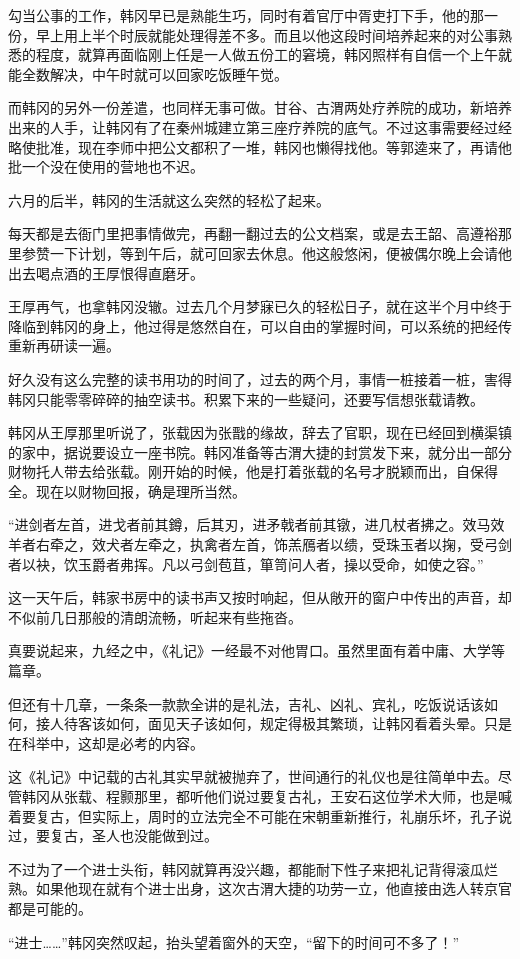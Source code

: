勾当公事的工作，韩冈早已是熟能生巧，同时有着官厅中胥吏打下手，他的那一份，早上用上半个时辰就能处理得差不多。而且以他这段时间培养起来的对公事熟悉的程度，就算再面临刚上任是一人做五份工的窘境，韩冈照样有自信一个上午就能全数解决，中午时就可以回家吃饭睡午觉。

而韩冈的另外一份差遣，也同样无事可做。甘谷、古渭两处疗养院的成功，新培养出来的人手，让韩冈有了在秦州城建立第三座疗养院的底气。不过这事需要经过经略使批准，现在李师中把公文都积了一堆，韩冈也懒得找他。等郭逵来了，再请他批一个没在使用的营地也不迟。

六月的后半，韩冈的生活就这么突然的轻松了起来。

每天都是去衙门里把事情做完，再翻一翻过去的公文档案，或是去王韶、高遵裕那里参赞一下计划，等到午后，就可回家去休息。他这般悠闲，便被偶尔晚上会请他出去喝点酒的王厚恨得直磨牙。

王厚再气，也拿韩冈没辙。过去几个月梦寐已久的轻松日子，就在这半个月中终于降临到韩冈的身上，他过得是悠然自在，可以自由的掌握时间，可以系统的把经传重新再研读一遍。

好久没有这么完整的读书用功的时间了，过去的两个月，事情一桩接着一桩，害得韩冈只能零零碎碎的抽空读书。积累下来的一些疑问，还要写信想张载请教。

韩冈从王厚那里听说了，张载因为张戬的缘故，辞去了官职，现在已经回到横渠镇的家中，据说要设立一座书院。韩冈准备等古渭大捷的封赏发下来，就分出一部分财物托人带去给张载。刚开始的时候，他是打着张载的名号才脱颖而出，自保得全。现在以财物回报，确是理所当然。

“进剑者左首，进戈者前其鐏，后其刃，进矛戟者前其镦，进几杖者拂之。效马效羊者右牵之，效犬者左牵之，执禽者左首，饰羔鴈者以缋，受珠玉者以掬，受弓剑者以袂，饮玉爵者弗挥。凡以弓剑苞苴，箪笥问人者，操以受命，如使之容。”

这一天午后，韩家书房中的读书声又按时响起，但从敞开的窗户中传出的声音，却不似前几日那般的清朗流畅，听起来有些拖沓。

真要说起来，九经之中，《礼记》一经最不对他胃口。虽然里面有着中庸、大学等篇章。

但还有十几章，一条条一款款全讲的是礼法，吉礼、凶礼、宾礼，吃饭说话该如何，接人待客该如何，面见天子该如何，规定得极其繁琐，让韩冈看着头晕。只是在科举中，这却是必考的内容。

这《礼记》中记载的古礼其实早就被抛弃了，世间通行的礼仪也是往简单中去。尽管韩冈从张载、程颢那里，都听他们说过要复古礼，王安石这位学术大师，也是喊着要复古，但实际上，周时的立法完全不可能在宋朝重新推行，礼崩乐坏，孔子说过，要复古，圣人也没能做到过。

不过为了一个进士头衔，韩冈就算再没兴趣，都能耐下性子来把礼记背得滚瓜烂熟。如果他现在就有个进士出身，这次古渭大捷的功劳一立，他直接由选人转京官都是可能的。

“进士……”韩冈突然叹起，抬头望着窗外的天空，“留下的时间可不多了！”

